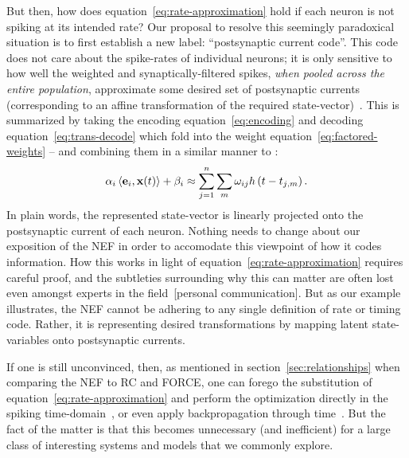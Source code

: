 But then, how does equation~\ref{eq:rate-approximation} hold if each neuron is not spiking at its intended rate?
Our proposal to resolve this seemingly paradoxical situation is to first establish a new label: ``postsynaptic current code''.
This code does not care about the spike-rates of individual neurons; it is only sensitive to how well the weighted and synaptically-filtered spikes, \emph{when pooled across the entire population}, approximate some desired set of postsynaptic currents (corresponding to an affine transformation of the required state-vector)~\citep{tripp2006neural}.
This is summarized by taking the encoding equation~\ref{eq:encoding} and decoding equation~\ref{eq:trans-decode} which fold into the weight equation~\ref{eq:factored-weights} -- and combining them in a similar manner to \citet{stoeckel2018}:
\begin{equation} \label{eq:psc-code}
\alpha_i \left\langle \mathbf{e}_i\text{,}\, \mathbf{x}(t) \right\rangle + \beta_i \approx \sum_{j=1}^n \sum_m \omega_{ij} h \left( t - t_{j\text{,}m} \right) \text{.}
\end{equation}
In plain words, the represented state-vector is linearly projected onto the postsynaptic current of each neuron. 
Nothing needs to change about our exposition of the NEF in order to accomodate this viewpoint of how it codes information.
How this works in light of equation~\ref{eq:rate-approximation} requires careful proof, and the subtleties surrounding why this can matter are often lost even amongst experts in the field~[personal communication].
But as our example illustrates, the NEF cannot be adhering to any single definition of rate or timing code.
Rather, it is representing desired transformations by mapping latent state-variables onto postsynaptic currents.  %

If one is still unconvinced, then, as mentioned in section~\ref{sec:relationships} when comparing the NEF to RC and FORCE, one can forego the substitution of equation~\ref{eq:rate-approximation} and perform the optimization directly in the spiking time-domain~\citep{voelker2016a, duggins2017incorporating}, or even apply backpropagation through time~\citep{rasmussen2018nengodl}.
But the fact of the matter is that this becomes unnecessary (and inefficient) for a large class of interesting systems and models that we commonly explore.

